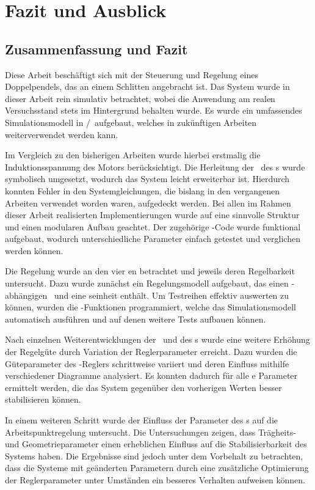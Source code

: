 \chapter{Fazit und Ausblick}

\section{Zusammenfassung und Fazit}

Diese Arbeit beschäftigt sich mit der Steuerung und Regelung eines Doppelpendels, das an einem Schlitten angebracht ist.
Das System wurde in dieser Arbeit rein simulativ betrachtet, wobei die Anwendung am realen Versuchsstand stets im Hintergrund behalten wurde.
Es wurde ein umfassendes Simulationsmodell in \ml/\sm\ aufgebaut, welches in zukünftigen Arbeiten weiterverwendet werden kann. 

Im Vergleich zu den bisherigen Arbeiten wurde hierbei erstmalig die Induktionsspannung des Motors berücksichtigt.
Die Herleitung der \bwgl\ des \spds s wurde symbolisch umgesetzt, wodurch das System leicht erweiterbar ist.
Hierdurch konnten Fehler in den Systemgleichungen, die bislang in den vergangenen Arbeiten verwendet worden waren, aufgedeckt werden.
Bei allen im Rahmen dieser Arbeit realisierten Implementierungen wurde auf eine sinnvolle Struktur und einen modularen Aufbau geachtet.
Der zugehörige \ml-Code wurde funktional aufgebaut, wodurch unterschiedliche Parameter einfach getestet und verglichen werden können.

Die Regelung wurde an den vier \ap en betrachtet und jeweils deren Regelbarkeit untersucht.
Dazu wurde zunächst ein Regelungsmodell aufgebaut, das einen \ap-abhängigen \zsr\ und eine \vorst seinheit enthält.
Um Testreihen effektiv auswerten zu können, wurden die \xots-Funktionen programmiert, welche das Simulationsmodell automatisch ausführen und auf denen weitere Tests aufbauen können.

Nach einzelnen Weiterentwicklungen der \vorst\ und des \beob s wurde eine weitere Erhöhung der Regelgüte durch Variation der Reglerparameter erreicht.
Dazu wurden die Güteparameter des \ricc-Reglers schrittweise variiert und deren Einfluss mithilfe verschiedener Diagramme analysiert.
Es konnten dadurch für alle \ap e Parameter ermittelt werden, die das System gegenüber den vorherigen Werten besser stabilisieren können.

In einem weiteren Schritt wurde der Einfluss der Parameter des \dpd s auf die Arbeitspunktregelung untersucht.
Die Untersuchungen zeigen, dass Trägheits- und Geometrieparameter einen erheblichen Einfluss auf die Stabilisierbarkeit des Systems haben.
Die Ergebnisse sind jedoch unter dem Vorbehalt zu betrachten, dass die Systeme mit geänderten Parametern durch eine zusätzliche Optimierung der Reglerparameter unter Umständen ein besseres Verhalten aufweisen können. 

